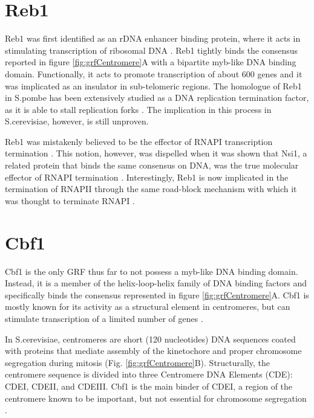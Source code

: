 \section{Reb1}

Reb1 was first identified as an rDNA enhancer binding protein, where it acts in stimulating transcription of ribosomal DNA \cite{planta:1995:global}. 
Reb1 tightly binds the consensus reported in figure \ref{fig:grfCentromere}A with a bipartite myb-like DNA binding domain.
Functionally, it acts to promote transcription of about 600 genes and it was implicated as an insulator in sub-telomeric regions. 
The homologue of Reb1 in S.pombe has been extensively studied as a DNA replication termination factor, as it is able to stall replication forks \cite{sa:2004:transcription}. The implication in this process in S.cerevisiae, however, is still unproven.


Reb1 was mistakenly believed to be the effector of RNAPI transcription termination \cite{lang:1995:transcription}. 
This notion, however, was dispelled when it was shown that Nsi1, a related protein that binds the same consensus on DNA, was the true molecular effector of RNAPI termination \cite{reiter:2012:reb1homologue}. 
Interestingly, Reb1 is now implicated in the termination of RNAPII through the same road-block mechanism with which it was thought to terminate RNAPI \cite{colin:2014:roadblock}.


\section{Cbf1}

Cbf1 is the only GRF thus far to not possess a myb-like DNA binding domain. Instead, it is a member of the helix-loop-helix family of DNA binding factors and specifically binds the consensus represented in figure \ref{fig:grfCentromere}A. 
Cbf1 is mostly known for its activity as a structural element in centromeres, but can stimulate transcription of a limited number of genes \cite{mellor:1990:cpf1}.


In S.cerevisiae, centromeres are short (120 nucleotides) DNA sequences coated with proteins that mediate assembly of the kinetochore and proper chromosome segregation during mitosis (Fig. \ref{fig:grfCentromere}B). 
Structurally, the centromere sequence is divided into three Centromere DNA Elements (CDE): CDEI, CDEII, and CDEIII. Cbf1 is the main binder of CDEI, a region of the centromere known to be important, but not essential for chromosome segregation \cite{niedenthal:1993:cpf1}. 

